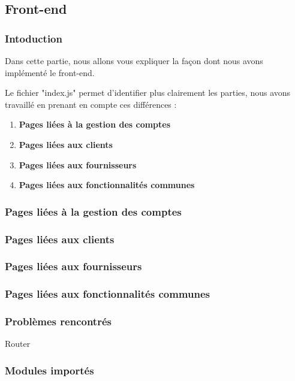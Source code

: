 \subsection{Front-end}
\subsubsection{Intoduction}
\begin{flushleft}
Dans cette partie, nous allons vous expliquer la façon dont nous avons implémenté le front-end.
\end{flushleft}
\begin{flushleft}
Le fichier "index.js" permet d'identifier plus clairement les parties, nous avons travaillé en prenant en compte ces différences : 
\end{flushleft}
\begin{enumerate}[-]
\item \textbf{Pages liées à la gestion des comptes}
\item \textbf{Pages liées aux clients}
\item \textbf{Pages liées aux fournisseurs}
\item \textbf{Pages liées aux fonctionnalités communes}
\end{enumerate} 
\subsubsection{Pages liées à la gestion des comptes}

\subsubsection{Pages liées aux clients}

\subsubsection{Pages liées aux fournisseurs}

\subsubsection{Pages liées aux fonctionnalités communes}

\subsubsection{Problèmes rencontrés}
Router
\subsubsection{Modules importés}
